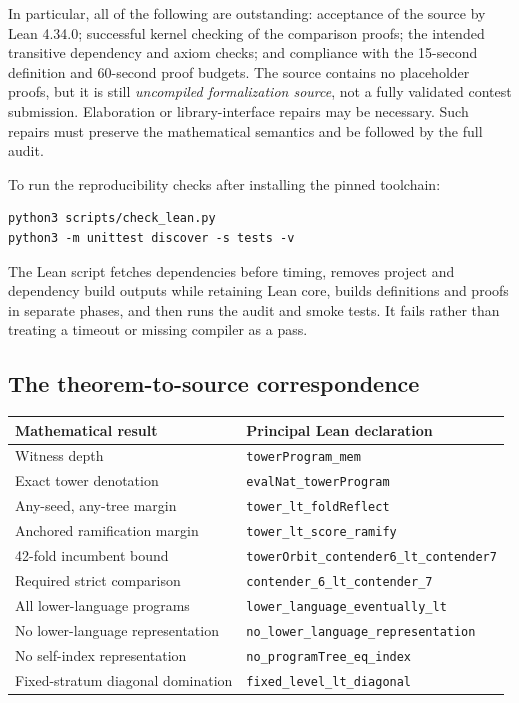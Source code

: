 \documentclass[11pt]{article}
\theoremstyle{definition}
\theoremstyle{remark}
\newcommand{\code}[1]{\texttt{#1}}
\begin{document}
In particular, all of the following are outstanding: acceptance of the
source by Lean 4.34.0; successful kernel checking of the comparison proofs;
the intended transitive dependency and axiom checks; and compliance with the
15-second definition and 60-second proof budgets. The source contains no
placeholder proofs, but it is still \emph{uncompiled formalization source},
not a fully validated contest submission. Elaboration or library-interface
repairs may be necessary. Such repairs must preserve the mathematical
semantics and be followed by the full audit.

To run the reproducibility checks after installing the pinned toolchain:
\begin{lstlisting}[language={}]
python3 scripts/check_lean.py
python3 -m unittest discover -s tests -v
\end{lstlisting}
The Lean script fetches dependencies before timing, removes project and
dependency build outputs while retaining Lean core, builds definitions and
proofs in separate phases, and then runs the audit and smoke tests. It fails
rather than treating a timeout or missing compiler as a pass.

\subsection{The theorem-to-source correspondence}

\begin{center}
\small
\begin{tabularx}{\linewidth}{@{}l X@{}}
\toprule
Mathematical result & Principal Lean declaration\\
\midrule
Witness depth & \code{towerProgram\_mem}\\
Exact tower denotation & \code{evalNat\_towerProgram}\\
Any-seed, any-tree margin & \code{tower\_lt\_foldReflect}\\
Anchored ramification margin & \code{tower\_lt\_score\_ramify}\\
42-fold incumbent bound & \code{towerOrbit\_contender6\_lt\_contender7}\\
Required strict comparison & \code{contender\_6\_lt\_contender\_7}\\
All lower-language programs & \code{lower\_language\_eventually\_lt}\\
No lower-language representation & \code{no\_lower\_language\_representation}\\
No self-index representation & \code{no\_programTree\_eq\_index}\\
Fixed-stratum diagonal domination & \code{fixed\_level\_lt\_diagonal}\\
\bottomrule
\end{tabularx}
\end{center}
\end{document}
